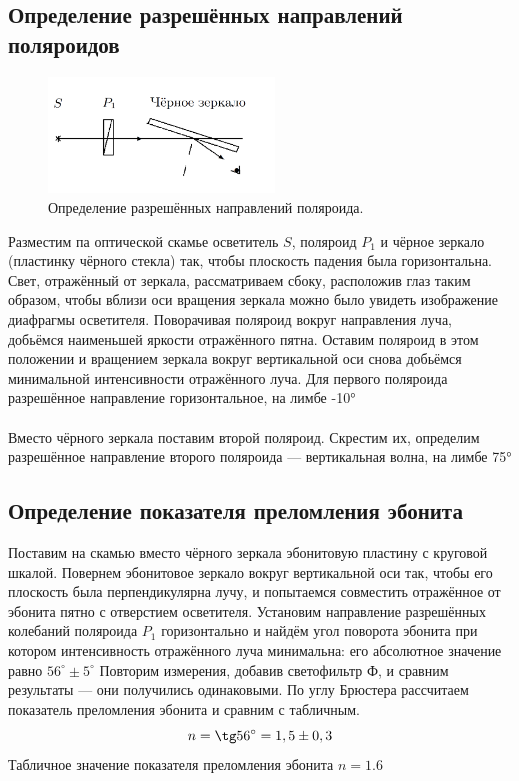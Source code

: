 \documentclass[a4paper,12pt]{article} %
\begin{document}
\subsection{Определение разрешённых направлений поляроидов}
\begin{figure}
	\includegraphics[width=6cm]{1.png}
	\caption{Определение разрешённых направлений поляроида.}
	\label{pic:1}
\end{figure}
Разместим па оптической скамье осветитель $ S $, поляроид $ P_1 $ и чёрное зеркало (пластинку чёрного стекла) так, чтобы плоскость падения была горизонтальна. Свет, отражённый от зеркала, рассматриваем сбоку, расположив глаз таким образом, чтобы вблизи оси вращения зеркала можно было увидеть изображение диафрагмы осветителя. Поворачивая поляроид вокруг направления луча, добьёмся наименьшей яркости отражённого пятна. Оставим поляроид в этом положении и вращением зеркала вокруг вертикальной оси снова добьёмся минимальной интенсивности отражённого луча.
Для первого поляроида разрешённое направление горизонтальное, на лимбе -10°
\\\\
Вместо чёрного зеркала поставим второй поляроид. Скрестим их, определим разрешённое направление второго поляроида --- вертикальная волна, на лимбе 75°

\subsection{Определение показателя преломления эбонита}
Поставим на скамью вместо чёрного зеркала эбонитовую пластину с круговой шкалой.
Повернем эбонитовое зеркало вокруг вертикальной оси так, чтобы его плоскость была перпендикулярна лучу, и попытаемся совместить отражённое от эбонита пятно с отверстием осветителя.
Установим направление разрешённых колебаний поляроида $ P_1 $ горизонтально и найдём угол поворота эбонита при котором интенсивность отражённого луча минимальна: его абсолютное значение равно $ 56^{\circ} \pm 5^{\circ} $
Повторим измерения, добавив светофильтр Ф, и сравним результаты --- они получились одинаковыми.
По углу Брюстера рассчитаем показатель преломления эбонита и сравним с табличным.
\begin{equation}\label{eq:1}
	n = \tg 56^{\circ} = 1,5 \pm 0,3
\end{equation}
Табличное значение показателя преломления эбонита $ n = 1.6 $
\newpage
\end{document}
